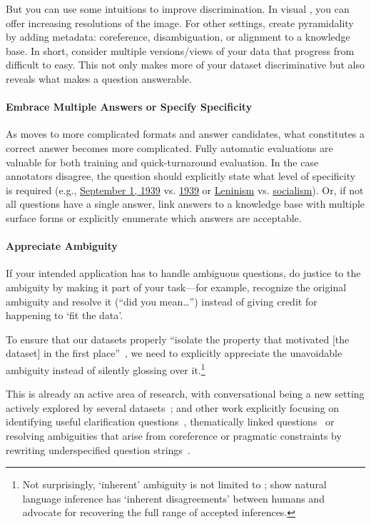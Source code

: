 But you can use some \qb{} intuitions to improve discrimination.
In visual , you can offer increasing resolutions of the image.
For other settings, create pyramidality by adding metadata: coreference, disambiguation, or alignment to a knowledge base.
In short, consider multiple versions/views of your data that progress from difficult to easy.
This not only makes more of your dataset discriminative but also reveals what makes a question answerable.

\paragraph{Embrace Multiple Answers or Specify Specificity}

As \qa{} moves to more complicated formats and answer candidates, what constitutes a correct answer becomes more complicated.
Fully automatic evaluations are valuable for both training and quick-turnaround evaluation.
In the case annotators disagree, the question should explicitly state what level of specificity is required (e.g., \underline{September 1, 1939} vs. \underline{1939} or \underline{Leninism} vs. \underline{socialism}).
Or, if not all questions have a single answer, link answers to a knowledge base with multiple surface forms or explicitly enumerate which answers are acceptable.

\paragraph{Appreciate Ambiguity}

If your intended  application has to handle ambiguous questions,
do justice to the ambiguity by making it part of your task---for example, recognize the
original ambiguity and resolve it (``did you mean\dots'') instead of giving credit
for happening to `fit the data'.

To ensure that our datasets properly ``isolate the property that
motivated [the dataset] in the first place''~\cite{Zaenen-2006}, we
need to explicitly appreciate the unavoidable ambiguity instead of
silently glossing over it.\footnote{Not surprisingly, `inherent'
  ambiguity is not limited to ; \citet{pavlick-19} show
  natural language inference has `inherent disagreements'
  between humans and advocate for recovering the full range of
  accepted inferences.}

This is already an active area of research, with conversational  being a new setting
actively explored by several datasets~\cite{reddy-18,choi-18}; and other work explicitly focusing on
identifying useful clarification questions~\cite{rao-2018}, thematically linked questions~\cite{elgohary-18} or resolving ambiguities that arise from
coreference or pragmatic constraints by rewriting underspecified question strings~\cite{elgohary-19,min-20}.

